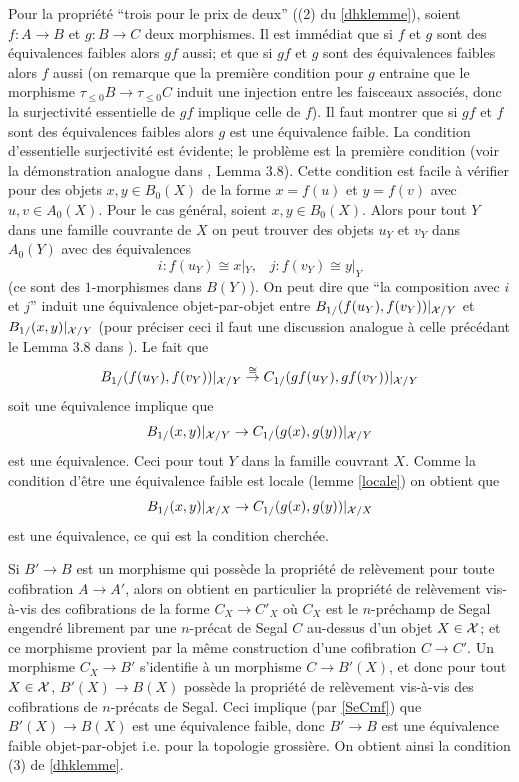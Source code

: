 \documentclass[12pt]{article}
\newcommand{\Xx}{{\cal X}}
\begin{document}
Pour la propri\'et\'e ``trois pour le prix de deux'' ((2) du \ref{dhklemme}),
soient $f: A\rightarrow B$ et $g: B\rightarrow C$ deux morphismes. Il est
imm\'ediat que si $f$ et $g$ sont
des \'equivalences faibles alors $gf$ aussi; et que si $gf$ et $g$ sont des
\'equivalences faibles alors $f$ aussi (on remarque que la premi\`ere
condition pour $g$ entraine que le morphisme $\tau _{\leq 0}B\rightarrow \tau
_{\leq 0}C$ induit une injection entre les faisceaux associ\'es, donc la
surjectivit\'e essentielle de $gf$ implique celle de $f$). Il faut montrer
que si $gf$
et $f$
sont des \'equivalences faibles alors $g$ est une \'equivalence faible.
La condition d'essentielle surjectivit\'e est \'evidente; le probl\`eme est la
premi\`ere condition (voir la d\'emonstration analogue dans \cite{nCAT}, Lemma
3.8). Cette condition est facile \`a v\'erifier pour des objets
$x,y\in B_0(X)$ de la forme
$x=f(u)$ et $y=f(v)$ avec $u,v\in A_0(X)$. Pour le cas g\'en\'eral, soient
$x,y\in
B_0(X)$. Alors pour tout $Y$ dans une famille couvrante de $X$ on peut
trouver des
objets $u_Y$ et $v_Y$ dans $A_0(Y)$ avec des \'equivalences
$$
i: f(u_Y)\cong x|_Y, \;\;\; j: f(v_Y)\cong y|_Y
$$
(ce sont des $1$-morphismes dans $B(Y)$). On peut dire que ``la composition avec
$i$ et $j$'' induit une \'equivalence objet-par-objet entre
$B_{1/}(f(u_Y), f(v_Y))|_{\Xx /Y}$ et
$B_{1/}(x,y)|_{\Xx /Y}$ (pour pr\'eciser ceci il faut une discussion
analogue \`a celle pr\'ec\'edant le   Lemma 3.8 dans \cite{nCAT}). Le fait que
$$
B_{1/}(f(u_Y), f(v_Y))|_{\Xx /Y}\stackrel{\cong}{\rightarrow}
C_{1/}(gf(u_Y), gf(v_Y))|_{\Xx /Y}
$$
soit une \'equivalence
implique que
$$
B_{1/}(x, y)|_{\Xx /Y}\rightarrow
C_{1/}(g(x), g(y))|_{\Xx /Y}
$$
est une \'equivalence. Ceci pour tout $Y$ dans la famille couvrant $X$.
Comme la condition d'\^etre une \'equivalence faible est locale
(lemme \ref{locale})
on obtient que
$$
B_{1/}(x, y)|_{\Xx /X}\rightarrow
C_{1/}(g(x), g(y))|_{\Xx /X}
$$
est une \'equivalence, ce qui est la condition cherch\'ee.

Si $B'\rightarrow B$ est un morphisme qui poss\`ede la propri\'et\'e de
rel\`evement pour toute cofibration $A\rightarrow A'$, alors on obtient en
particulier la propri\'et\'e de rel\`evement vis-\`a-vis des cofibrations
de la forme
$C_X\rightarrow C'_X$ o\`u $C_X$ est le $n$-pr\'echamp de Segal engendr\'e
librement par une $n$-pr\'ecat de Segal $C$ au-dessus d'un objet $X\in \Xx$;
et ce morphisme provient par la m\^eme construction d'une cofibration
$C\rightarrow C'$. Un morphisme  $C_X\rightarrow B'$ s'identifie \`a un
morphisme $C\rightarrow B'(X)$, et donc pour tout $X\in \Xx$, $B'(X)\rightarrow
B(X)$ poss\`ede la propri\'et\'e de rel\`evement vis-\`a-vis des cofibrations
de $n$-pr\'ecats de Segal. Ceci implique (par \ref{SeCmf}) que $B'(X)\rightarrow
B(X)$ est une \'equivalence faible, donc $B'\rightarrow B$ est une
\'equivalence faible objet-par-objet i.e. pour la topologie grossi\`ere. On
obtient ainsi la condition (3) de \ref{dhklemme}.
\end{document}
